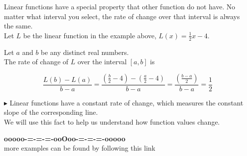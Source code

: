 \documentclass{ximera}
\begin{document}
Linear functions have a special property that other function do not have.  No matter what interval you select, the rate of change over that interval is always the same. \\



Let $L$ be the linear function in the example above, $L(x) = \frac{1}{2} x - 4$. 

Let $a$ and $b$ be any distinct real numbers. \\

The rate of change of $L$ over the interval $[a, b]$ is


\[
\frac{L(b) - L(a)}{b - a} = \frac{\left( \frac{b}{2} - 4 \right) - \left( \frac{a}{2} - 4 \right)}{b-a} 
= \frac{\left( \frac{b - a}{2} \right)}{b-a} = \frac{1}{2}
\]



\textbf{\textcolor{blue!55!black}{$\blacktriangleright$}} Linear functions have a constant rate of change, which measures the constant slope of the corresponding line. \\



We will use this fact to help us understand how function values change.









\begin{center}
\textbf{\textcolor{green!50!black}{ooooo-=-=-=-ooOoo-=-=-=-ooooo}} \\

more examples can be found by following this link\\ 

\end{center}
\end{document}
